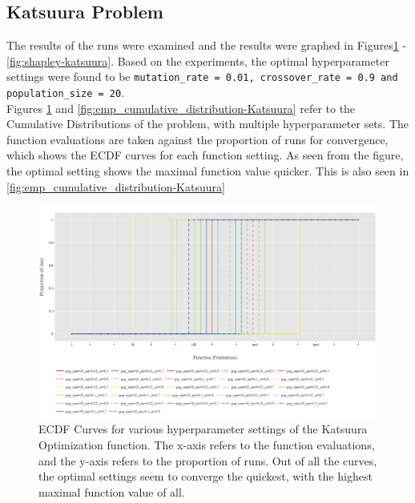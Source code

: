 \documentclass{article}
\begin{document}
\label{fig:ert-labs}

\label{fig:ert-nqueens}

\subsection{Katsuura Problem}
The results of the runs were examined and the results were graphed in  Figures\ref{fig:cumulative_distribution-Katsuura} - \ref{fig:shapley-katsuura}. Based on the experiments, the optimal hyperparameter settings were found to be \texttt{mutation\_rate = 0.01, crossover\_rate = 0.9 and population\_size = 20}.\\
Figures \ref{fig:cumulative_distribution-Katsuura} and \ref{fig:emp_cumulative_distribution-Katsuura} refer to the Cumulative Distributions of the problem, with multiple hyperparameter sets. The function evaluations are taken against the proportion of runs for convergence, which shows the ECDF curves for each function setting. As seen from the figure, the optimal setting shows the maximal function value quicker. This is also seen in \ref{fig:emp_cumulative_distribution-Katsuura}
 \begin{figure}[h!]
    \centering
    \includegraphics[width=1\linewidth]{Graphs/Katsuura/Cumulative_Distribution.png}
    \caption{ECDF Curves for various hyperparameter settings of the Katsuura Optimization function. The x-axis refers to the function evaluations, and the y-axis refers to the proportion of runs. Out of all the curves, the optimal settings seem to converge the quickest, with the highest maximal function value of all. }
    \label{fig:cumulative_distribution-Katsuura}
\end{figure}
\end{document}
